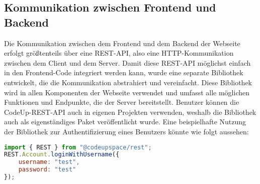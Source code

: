 \documentclass[main.tex]{subfiles}
\begin{document}
    \subsection{Kommunikation zwischen Frontend und Backend}
    Die Kommunikation zwischen dem Frontend und dem Backend der Webseite erfolgt größtenteils über eine REST-API, also eine HTTP-Kommunikation zwischen dem Client und dem Server.
    Damit diese REST-API möglichst einfach in den Frontend-Code integriert werden kann, wurde eine separate Bibliothek entwickelt, die die Kommunikation abstrahiert und vereinfacht.
    Diese Bibliothek wird in allen Komponenten der Webseite verwendet und umfasst alle möglichen Funktionen und Endpunkte, die der Server bereitstellt.
    Benutzer können die CodeUp-REST-API auch in eigenen Projekten verwenden, weshalb die Bibliothek auch als eigenständiges Paket veröffentlicht wurde.
    Eine beispielhafte Nutzung der Bibliothek zur Authentifizierung eines Benutzers könnte wie folgt aussehen:
    \begin{lstlisting}[language=javascript]
import { REST } from "@codeupspace/rest";
REST.Account.loginWithUsername({
    username: "test",
    password: "test"
});
    \end{lstlisting}
\end{document}
